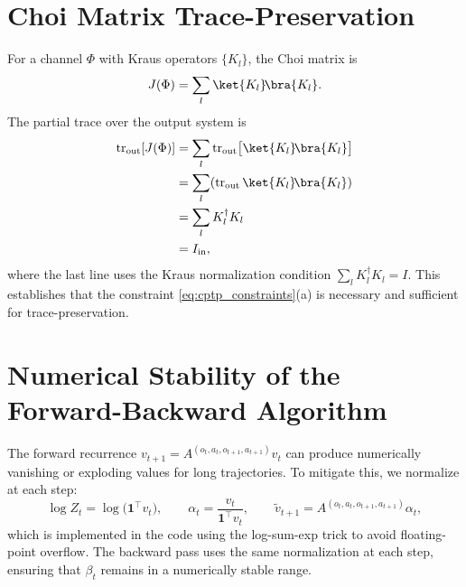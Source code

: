 
\section{Choi Matrix Trace-Preservation}

For a channel $\Phi$ with Kraus operators $\{K_l\}$, the Choi matrix is
\begin{equation}
J(\Phi) = \sum_l \ket{K_l}\!\bra{K_l}.
\end{equation}
The partial trace over the output system is
\begin{align}
\operatorname{tr}_{\mathrm{out}}[J(\Phi)]
  &= \sum_{l} \operatorname{tr}_{\mathrm{out}}\bigl[\ket{K_l}\!\bra{K_l}\bigr] \\
  &= \sum_l (\operatorname{tr}_{\mathrm{out}} \ket{K_l}\!\bra{K_l}) \\
  &= \sum_l K_l^\dagger K_l \\
  &= I_{\mathrm{in}},
\end{align}
where the last line uses the Kraus normalization condition
$\sum_l K_l^\dagger K_l = I$. This establishes that the constraint
\eqref{eq:cptp_constraints}(a) is necessary and sufficient for
trace-preservation.


\section{Numerical Stability of the Forward-Backward Algorithm}

The forward recurrence $v_{t+1} = A^{(o_t,a_t,o_{t+1},a_{t+1})} v_t$ can
produce numerically vanishing or exploding values for long trajectories.
To mitigate this, we normalize at each step:
\begin{equation}
\log Z_t = \log\!\bigl(\mathbf{1}^\top v_t\bigr),
\qquad
\alpha_t = \frac{v_t}{\mathbf{1}^\top v_t},
\qquad
\tilde v_{t+1} = A^{(o_t,a_t,o_{t+1},a_{t+1})} \alpha_t,
\end{equation}
which is implemented in the code using the log-sum-exp trick to avoid
floating-point overflow. The backward pass uses the same normalization
at each step, ensuring that $\beta_t$ remains in a numerically stable
range.

